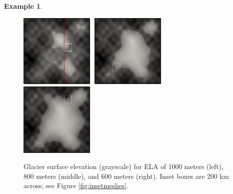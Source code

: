 \documentclass[]{interact}
\theoremstyle{plain}%
\theoremstyle{definition}
\newtheorem{example}[theorem]{Example}
\theoremstyle{remark}
\begin{document}
\begin{example}
\begin{figure}[ht]
\centering

\mbox{\includegraphics[width=0.32\textwidth]{static/glacier/surf1000.png} \,\includegraphics[width=0.32\textwidth]{static/glacier/surf800.png} \,\includegraphics[width=0.32\textwidth]{static/glacier/surf600.png}}
\caption{Glacier surface elevation (grayscale) for ELA of 1000 meters (left), 800 meters (middle), and 600 meters (right).  Inset boxes are 200 km across; see Figure \ref{fig:insetmeshes}.}
\label{fig:glacier}
\end{figure}


\end{example}
\end{document}
